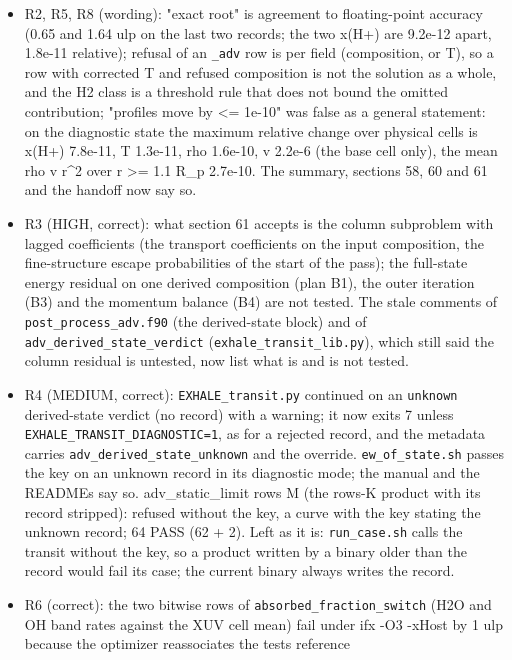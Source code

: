 \documentclass[english,a4paper]{my_memo}
\providecommand{\tightlist}{\setlength{\itemsep}{0pt}\setlength{\parskip}{0pt}}
\begin{document}
\begin{itemize}
\tightlist
\item
  R2, R5, R8 (wording): "exact root" is agreement to floating-point
  accuracy (0.65 and 1.64 ulp on the last two records; the two x(H+) are
  9.2e-12 apart, 1.8e-11 relative); refusal of an \texttt{\_adv} row is per field
  (composition, or T), so a row with corrected T and refused composition is
  not the solution as a whole, and the H2 class is a threshold rule that
  does not bound the omitted contribution; "profiles move by \textless= 1e-10" was
  false as a general statement: on the diagnostic state the maximum
  relative change over physical cells is x(H+) 7.8e-11, T 1.3e-11, rho
  1.6e-10, v 2.2e-6 (the base cell only), the mean rho v r\^{}2 over
  r \textgreater= 1.1 R\_p 2.7e-10. The summary, sections 58, 60 and 61 and the
  handoff now say so.
\item
  R3 (HIGH, correct): what section 61 accepts is the column subproblem
  with lagged coefficients (the transport coefficients on the input
  composition, the fine-structure escape probabilities of the start of the
  pass); the full-state energy residual on one derived composition (plan
  B1), the outer iteration (B3) and the momentum balance (B4) are not
  tested. The stale comments of \texttt{post\_process\_adv.f90} (the derived-state
  block) and of \texttt{adv\_derived\_state\_verdict} (\texttt{exhale\_transit\_lib.py}),
  which still said the column residual is untested, now list what is and
  is not tested.
\item
  R4 (MEDIUM, correct): \texttt{EXHALE\_transit.py} continued on an \texttt{unknown}
  derived-state verdict (no record) with a warning; it now exits 7 unless
  \texttt{EXHALE\_TRANSIT\_DIAGNOSTIC=1}, as for a rejected record, and the
  metadata carries \texttt{adv\_derived\_state\_unknown} and the override.
  \texttt{ew\_of\_state.sh} passes the key on an unknown record in its diagnostic
  mode; the manual and the READMEs say so. adv\_static\_limit rows M (the
  rows-K product with its record stripped): refused without the key, a
  curve with the key stating the unknown record; 64 PASS (62 + 2).
  Left as it is: \texttt{run\_case.sh} calls the transit without the key, so a
  product written by a binary older than the record would fail its case;
  the current binary always writes the record.
\item
  R6 (correct): the two bitwise rows of \texttt{absorbed\_fraction\_switch}
  (H2O and OH band rates against the XUV cell mean) fail under ifx -O3
  -xHost by 1 ulp because the optimizer reassociates the test\textquotesingle s reference

\end{itemize}
\end{document}
